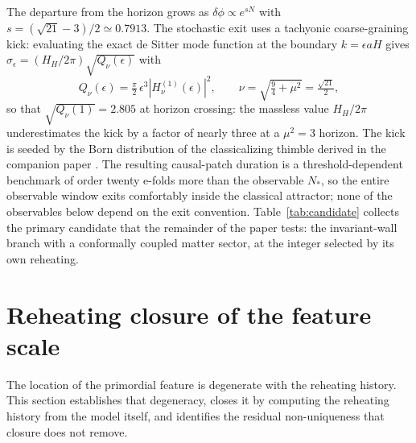 \documentclass[aps,prd,twocolumn,superscriptaddress,nofootinbib,longbibliography]{revtex4-2}
\begin{document}
The departure from the horizon grows as $\delta\phi\propto e^{sN}$ with
$s=(\sqrt{21}-3)/2\simeq0.7913$. The stochastic exit uses a tachyonic
coarse-graining kick: evaluating the exact de Sitter mode function at the
boundary $k=\epsilon aH$ gives
$\sigma_\epsilon=(H_H/2\pi)\sqrt{Q_\nu(\epsilon)}$ with
\begin{equation}
Q_\nu(\epsilon)=\tfrac{\pi}{2}\,\epsilon^3\left|H^{(1)}_\nu(\epsilon)\right|^2,
\qquad
\nu=\sqrt{\tfrac94+\mu^2}=\tfrac{\sqrt{21}}{2},
\end{equation}
so that $\sqrt{Q_\nu(1)}=2.805$ at horizon crossing: the massless value
$H_H/2\pi$ underestimates the kick by a factor of nearly three at a
$\mu^2=3$ horizon. The kick is seeded by the Born
distribution of the classicalizing thimble derived in the companion paper
\cite{PandevII}.
The resulting causal-patch duration is a threshold-dependent benchmark of
order twenty e-folds more than the observable $N_*$, so the entire observable
window exits comfortably inside the classical attractor; none of the
observables below depend on the exit convention. Table~\ref{tab:candidate}
collects the primary candidate that the remainder of the paper tests: the
invariant-wall branch with a conformally coupled matter sector, at the
integer selected by its own reheating.


\section{Reheating closure of the feature scale}
\label{sec:reheating}
The location of the primordial feature is degenerate with the reheating
history. This section establishes that degeneracy, closes it by computing the
reheating history from the model itself, and identifies the residual
non-uniqueness that closure does not remove.
\end{document}
